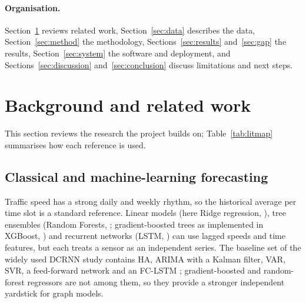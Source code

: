 \documentclass[11pt,a4paper]{article}
\begin{document}
\paragraph{Organisation.}
Section~\ref{sec:related} reviews related work, Section~\ref{sec:data} describes the data, Section~\ref{sec:method} the methodology, Sections~\ref{sec:results} and~\ref{sec:gap} the results, Section~\ref{sec:system} the software and deployment, and Sections~\ref{sec:discussion} and~\ref{sec:conclusion} discuss limitations and next steps.

\section{Background and related work}\label{sec:related}
This section reviews the research the project builds on; Table~\ref{tab:litmap} summarises how each reference is used.

\subsection{Classical and machine-learning forecasting}
Traffic speed has a strong daily and weekly rhythm, so the historical average per time slot is a standard reference.
Linear models (here Ridge regression, \citealp{hoerl1970ridge}), tree ensembles (Random Forests, \citealp{breiman2001rf}; gradient-boosted trees as implemented in XGBoost, \citealp{chen2016xgboost}) and recurrent networks (LSTM, \citealp{hochreiter1997lstm}) can use lagged speeds and time features, but each treats a sensor as an independent series.
The baseline set of the widely used DCRNN study contains HA, ARIMA with a Kalman filter, VAR, SVR, a feed-forward network and an FC-LSTM \citep{li2018dcrnn}; gradient-boosted and random-forest regressors are not among them, so they provide a stronger independent yardstick for graph models.
\end{document}
